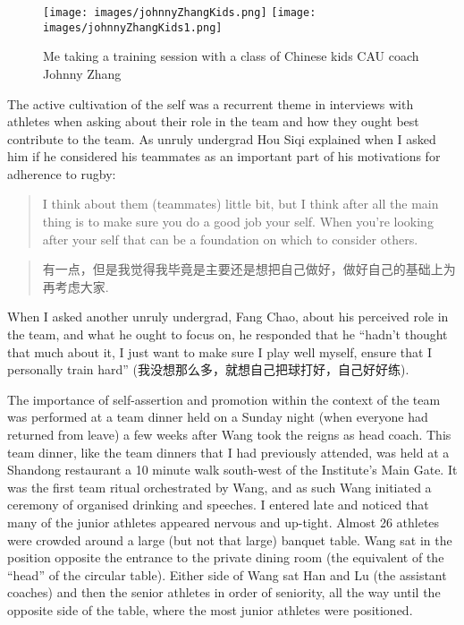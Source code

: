 \begin{CJK}{UTF8}{gbsn}
\begin{figure}[htbp]
  \begin{center}
    \texttt{[image: images/johnnyZhangKids.png]}
    \texttt{[image: images/johnnyZhangKids1.png]}
      \caption{Me taking a training session with a class of Chinese kids CAU coach Johnny Zhang}
        \label{fig:johnnyZhangKids}
   \end{center}
\end{figure}


The active cultivation of the self was a recurrent theme in interviews with athletes when asking about their role in the team and how they ought best contribute to the team.  As unruly undergrad Hou Siqi explained when I asked him if he considered his teammates as an important part of his motivations for adherence to rugby:

\begin{quotation}
  I think about them (teammates) little bit, but I think after all the main thing is to make sure you do a good job your self.  When you're looking after your self that can be a foundation on which to consider others.
\end{quotation}

\begin{quotation}
  有一点，但是我觉得我毕竟是主要还是想把自己做好，做好自己的基础上为再考虑大家.
\end{quotation}

When I asked another unruly undergrad, Fang Chao, about his perceived role in the team, and what he ought to focus on, he responded that he ``hadn't thought that much about it, I just want to make sure I play well myself, ensure that I personally train hard'' (我没想那么多，就想自己把球打好，自己好好练).

The importance of self-assertion and promotion within the context of the team was performed at a team dinner held on a Sunday night (when everyone had returned from leave) a few weeks after Wang took the reigns as head coach.  This team dinner, like the team dinners that I had previously attended, was held at a Shandong restaurant a 10 minute walk south-west of the Institute's Main Gate.  It was the first team ritual orchestrated by Wang, and as such Wang initiated a ceremony of organised drinking and speeches.  I entered late and noticed that many of the junior athletes appeared nervous and up-tight. Almost 26 athletes were crowded around a large (but not that large) banquet table.  Wang sat in the position opposite the entrance to the private dining room (the equivalent of the ``head'' of the circular table).  Either side of Wang sat Han and Lu (the assistant coaches) and then the senior athletes in order of seniority, all the way until the opposite side of the table, where the most junior athletes were positioned.


\end{CJK}
